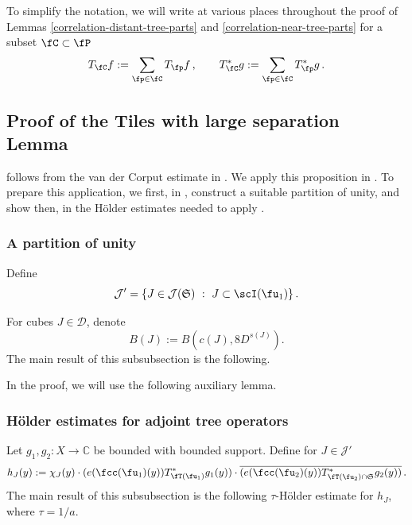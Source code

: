 


To simplify the notation, we will write at various places throughout the proof of Lemmas \ref{correlation-distant-tree-parts} and \ref{correlation-near-tree-parts} for a subset $\fC \subset \fP$
$$
    T_{\fC} f := \sum_{\fp \in \fC} T_{\fp} f\,, \quad\quad T_{\fC}^* g := \sum_{\fp\in\fC} T_{\fp}^* g\,.
$$

\subsection{Proof of the Tiles with large separation Lemma}
    \label{subsec-big-tiles}

 follows from the van der Corput estimate in . We apply this proposition in . To prepare this application, we first, in , construct a suitable partition of unity, and show then, in  the H\"older estimates needed to apply .

\subsubsection{A partition of unity}
\label{subsubsec-pao}
    Define
    $$
        \mathcal{J}' = \{J \in \mathcal{J}(\mathfrak{S}) \ : \ J \subset \scI(\fu_1)\}\,.
    $$


    

    For cubes $J \in \mathcal{D}$, denote
    \begin{equation}
        \label{def-BJ}
        B(J) := B(c(J), 8D^{s(J)}).
    \end{equation}
    The main result of this subsubsection is the following.


    In the proof, we will use the following auxiliary lemma.


    

    


\subsubsection{H\"older estimates for adjoint tree operators}
\label{subsubsec-holder-estimates}
    Let $g_1, g_2:X \to \mathbb{C}$ be bounded with bounded support.
    Define for $J \in \mathcal{J}'$
    \begin{equation}
        \label{def-hj}
        h_J(y) := \chi_J(y)\cdot(e(\fcc(\fu_1)(y)) T_{\fT(\fu_1)}^* g_1(y)) \cdot \overline{(e(\fcc(\fu_2)(y)) T_{\fT(\fu_2) \cap \mathfrak{S}}^* g_2(y))}\,.
    \end{equation}
    The main result of this subsubsection is the following $\tau$-H\"older estimate for $h_J$, where $\tau = 1/a$.

